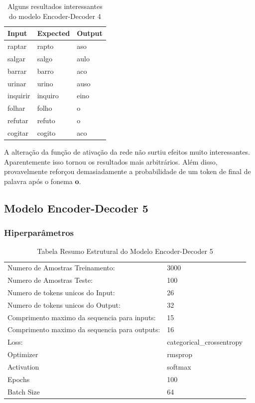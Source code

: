 \begin{table}[H]
\centering
\begin{tabular}{lll}
\textbf{Input} & \textbf{Expected} & \textbf{Output} \\ \hline
raptar& rapto& aso\\
salgar& salgo& aulo\\
barrar& barro& aco\\
urinar& urino& auso\\
inquirir& inquiro& eino\\
folhar& folho& o\\
refutar& refuto& o\\
cogitar& cogito& aco\\
\end{tabular}
\caption{Alguns resultados interessantes do modelo Encoder-Decoder 4}
\label{tab:res4}
\end{table}

A alteração da função de ativação da rede não surtiu efeitos muito interessantes. Aparentemente isso tornou os resultados mais arbitrários. Além disso, provavelmente reforçou demasiadamente a probabilidade de um token de final de palavra após o fonema \textbf{o}.
 
 \subsection{Modelo Encoder-Decoder 5}

\subsubsection{Hiperparâmetros} 

\begin{table}[H]
\centering
\begin{tabular}{ll}
Numero de Amostras Treinamento: & 3000 \\
Numero de Amostras Teste: & 100 \\
Numero de tokens unicos do Input: & 26 \\
Numero de tokens unicos do Output: & 32 \\
Comprimento maximo da sequencia para inputs: & 15 \\
Comprimento maximo da sequencia para outputs: & 16 \\
Loss: & categorical\_crossentropy \\
Optimizer & rmsprop \\
Activation & softmax \\
Epochs & 100 \\
Batch Size & 64
\end{tabular}
\caption{Tabela Resumo Estrutural do Modelo Encoder-Decoder 5}
\label{tab:res5}
\end{table}

